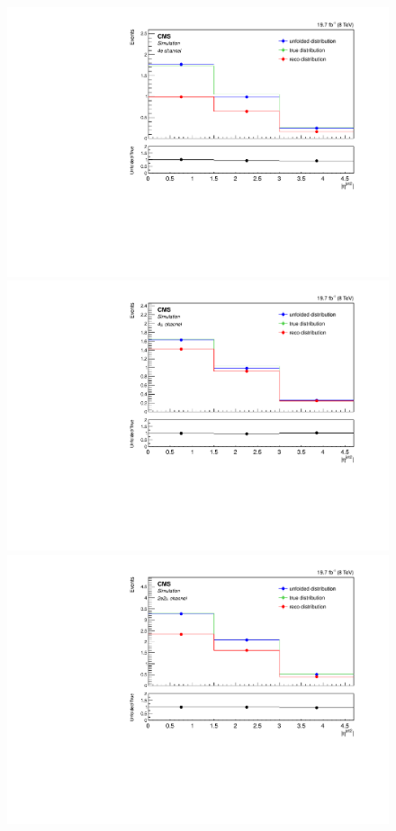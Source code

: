 \begin{figure}[hbtp]
\begin{center}
    \includegraphics[width=0.8\cmsFigWidth]{Figures/Unfolding/MCTests/EtaJet2_ZZTo4e_PowMatrix_PowDistr_HalfSample_fr}     
    \includegraphics[width=0.8\cmsFigWidth]{Figures/Unfolding/MCTests/EtaJet2_ZZTo4m_PowMatrix_PowDistr_HalfSample_fr}     
 \includegraphics[width=0.8\cmsFigWidth]{Figures/Unfolding/MCTests/EtaJet2_ZZTo2e2m_PowMatrix_PowDistr_HalfSample_fr}        

\end{center}
\end{figure}
